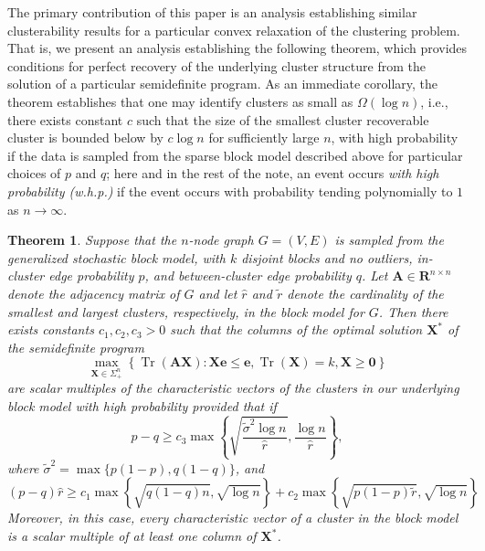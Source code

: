 \documentclass[twoside,11pt]{article}
\newtheorem{theorem}{Theorem}[section]
\newcommand{\R}{\mathbf{R}}
\DeclareMathOperator{\tr}{{Tr}}
\newcommand{\e}{\bs {e}}
\newcommand{\bs}{\boldsymbol}
\newcommand{\X}{\bs {X}}
\newcommand{\0}{\bs{0}}
\newcommand{\bra}[1]{\ensuremath{\left\{ #1 \right\}}} %
\newcommand{\ra}{\rightarrow}
\begin{document}
The primary contribution of this paper is an analysis establishing similar clusterability results for a particular
convex relaxation of the clustering problem.
That is, we present an analysis establishing the following theorem, which provides conditions for perfect recovery of the underlying cluster structure from 
the solution of a particular semidefinite program. 
As an immediate corollary, the theorem establishes that 
one may identify clusters
as small as \( \Omega(\log n)\),
i.e.,  there exists constant $c$ such that the size of the smallest cluster recoverable cluster is bounded below by \(c \log n \) for sufficiently large \(n\),
with high probability
if the data is sampled from the sparse block model described above
for particular choices of $p$ and $q$;
here and in the rest of the note, an event occurs \emph{with high probability (w.h.p.)} if the event occurs with probability
tending polynomially to $1$ as $n \ra \infty$.

\begin{theorem} \label{thm: simple}
	Suppose that the \(n\)-node graph \(G = (V,E)\) is sampled from the generalized stochastic block model,
	with \(k\) disjoint blocks and no outliers, in-cluster edge probability \(p\), and between-cluster edge probability \(q\).
	Let \(\bs A \in \R^{n\times n}\) denote the adjacency matrix of \(G\)
	and let \(\hat r\) and \(\tilde r\) denote the cardinality of the smallest and largest clusters, respectively,
	in the block model for \(G\).
	Then there exists constants $c_1, c_2, c_3 > 0$ such that the columns of the optimal solution \(\X^*\) of
	the semidefinite program
	\begin{equation*} \label{eq: SDP}
	\max_{\X \in \Sigma_+^n} \bra{ \tr(\bs A \X) : \X \e \le \e, \tr(\X) = k, \X \ge \0 }
	\end{equation*} 
	are scalar multiples of the characteristic vectors of the clusters in our underlying block model
	with high probability
	provided that
	if 
	\[
		p - q \ge c_3 \max \bra{ \sqrt{\frac{\tilde \sigma^2 \log n}{\hat r}}, \frac{\log n}{\hat r} },
	\]
	where $\tilde \sigma^2 = \max\{{p(1-p)}, q(1-q) \}$, and
	\begin{equation*}
		(p-q) \hat r \ge c_1 \max \bra{ \sqrt{ q(1-q) n },\sqrt{ \log n}  } 
		+ c_2 \max \bra{ \sqrt{p(1-p) \tilde r }, \sqrt{\log n} } 
	\end{equation*}	
	Moreover, in this case, every characteristic vector of a cluster in the block model is a 
	scalar multiple of at least one column of \(\X^*\).
\end{theorem}
\end{document}
